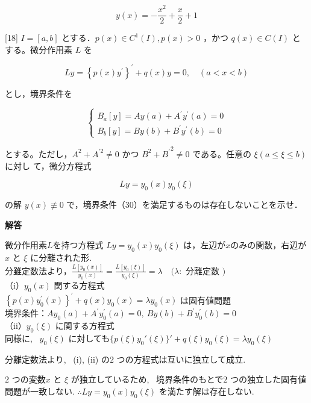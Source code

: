 \documentclass{jsarticle}
\begin{document}
$$
y(x)=-\frac{x^{2}}{2}+\frac{x}{2}+1
$$


\bigskip
\bigskip

\begin{itembox}[l]{[18]}
$I=[a, b]$ とする．$p(x) \in C^{1}(I), p(x)>0$ ，かつ $q(x) \in C(I)$ とする。微分作用素 $L$ を


\begin{equation*}
L y=\left\{p(x) y^{\prime}\right\}^{\prime}+q(x) y=0, \quad(a<x<b) \tag{29}
\end{equation*}


とし，境界条件を

\[
\left\{\begin{array}{l}
B_{a}[y]=A y(a)+A^{\prime} y^{\prime}(a)=0  \tag{30}\\
B_{b}[y]=B y(b)+B^{\prime} y^{\prime}(b)=0
\end{array}\right.
\]

とする。ただし，$A^{2}+A^{\prime 2} \neq 0$ かつ $B^{2}+{B^{\prime}}^{2} \neq 0$ である。任意の $\xi(a \leqslant \xi \leqslant b)$ に対し て，微分方程式


\begin{equation*}
L y=y_{0}(x) y_{0}(\xi) \tag{31}
\end{equation*}


の解 $y(x) \not \equiv 0$ で，境界条件（30）を満足するものは存在しないことを示せ．  
\end{itembox}

\textbf{解答}

微分作用素$L$を持つ方程式 $L y=y_{0}(x) y_{0}(\xi)$ は，左辺が$x$のみの関数，右辺が$x$ と $\xi$ に分離された形.\\
分雖定数法より，$\frac{L\left[y_{0}(x)\right]}{y_{0}(x)}=\frac{L\left[y_{0}(\xi)\right]}{y_{0}(\xi)}=\lambda \quad(\lambda:$ 分離定数 $)$\\
（i）$y_{0}(x) $ 関する方程式\\
$\left\{p(x) y_{0}^{\prime}(x)\right\}^{\prime}+q(x) y_{0}(x)=\lambda y_{0}(x)$ は固有値問題\\
境界条件：$A y_{0}(a)+A^{\prime} y_{0}^{\prime}(a)=0, \ B y(b)+B^{\prime} y_{0}^{\prime}(b)=0$\\
（ii）$y_0(\xi)$ に関する方程式\\
同様に, \ $y_0(\xi)$ に対しても$\{p(\xi)y_0'(\xi) \}' + q(\xi)y_0(\xi) = \lambda y_0(\xi)$

分離定数法より, \ (i), (ii) の$2$ つの方程式は互いに独立して成立.

$2$ つの変数$x$ と $\xi$ が独立しているため, \ 境界条件のもとで$2$ つの独立した固有値問題が一致しない. $\therefore Ly=y_{0}(x) y_{0}(\xi)$ を満たす解は存在しない.
\end{document}
